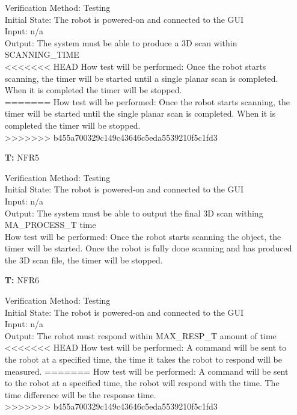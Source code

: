 \documentclass[12pt, titlepage]{article}
\newcounter{tnum} %
\begin{document}
\begin{itemize}
Verification Method: Testing	\\				
Initial State: The robot is powered-on and connected to the GUI\\		
Input: n/a\\
Output: The system must be able to produce a 3D scan within SCANNING\_TIME \\
<<<<<<< HEAD
How test will be performed: Once the robot starts scanning, the timer will be started until a single planar scan is completed. When it is completed the timer will be stopped. \\
=======
How test will be performed: Once the robot starts scanning, the timer will be started until the single planar scan is completed. When it is completed the timer will be stopped. \\
>>>>>>> b455a700329c149c43646c5eda5539210f5c1fd3

\item[\textbf{T\refstepcounter{tnum}\thetnum:}]{NFR5\\}

Verification Method: Testing	\\				
Initial State: The robot is powered-on and connected to the GUI	\\			
Input: n/a\\
Output: The system must be able to output the final 3D scan withing MA\_PROCESS\_T time \\
How test will be performed: Once the robot starts scanning the object, the timer will be started. Once the robot is fully done scanning and has produced the 3D scan file, the timer will be stopped. \\

\item[\textbf{T\refstepcounter{tnum}\thetnum:}]{NFR6\\}

Verification Method: Testing	\\				
Initial State: The robot is powered-on and connected to the GUI\\	
Input: n/a\\
Output: The robot must respond within MAX\_RESP\_T amount of time \\
<<<<<<< HEAD
How test will be performed: A command will be sent to the robot at a specified time, the time it takes the robot to respond will be measured.
=======
How test will be performed: A command will be sent to the robot at a specified time, the robot will respond with the time. The time difference will be the response time. \\
>>>>>>> b455a700329c149c43646c5eda5539210f5c1fd3


\end{itemize}
\end{document}
